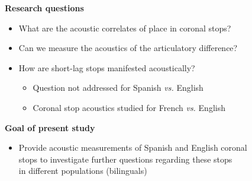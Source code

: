 \documentclass[a0paper,portrait,columns=2]{baposter}
\begin{document}
\begin{poster}
{\vspace{.1in}
\textbf{Research questions}
\vspace{.05in}

\begin{itemize}
	\item What are the acoustic correlates of place in coronal stops?
	\item Can we measure the acoustics of the articulatory difference?
	\item How are short-lag stops manifested acoustically?\\ \vspace{-.1in}
	\begin{itemize}
		\item Question not addressed for Spanish \emph{vs.} English
		\item Coronal stop acoustics studied for French \emph{vs.} English \cite{sundara2005acoustic}
	\end{itemize}
\end{itemize}



\vspace{.1in}
\textbf{Goal of present study}
\vspace{.05in}
	\begin{itemize}
		\item[] Provide acoustic measurements of Spanish and English coronal \\ stops to investigate further questions regarding these stops \\ in different populations (bilinguals)
	\end{itemize}

\vspace{.01in}

}



\end{poster}
\end{document}
